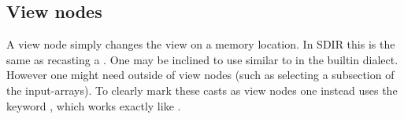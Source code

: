 \subsection{View nodes}
A view node simply changes the view on a memory location. In SDIR this is the same as recasting a . One may be inclined to use  similar to  in the builtin dialect. However one might need  outside of view nodes (such as selecting a subsection of the input-arrays). To clearly mark these casts as view nodes one instead uses the keyword , which works exactly like .